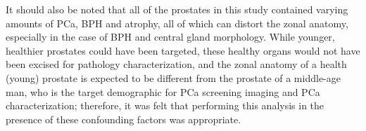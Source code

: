 It should also be noted that all of the prostates in this study contained
varying amounts of PCa, BPH and atrophy, all of which can distort the zonal
anatomy, especially in the case of BPH and central gland morphology.  While
younger, healthier prostates could have been targeted, these healthy organs
would not have been excised for pathology characterization, and the zonal
anatomy of a health (young) prostate is expected to be different from the
prostate of a middle-age man, who is the target demographic for PCa screening
imaging and PCa characterization; therefore, it was felt that performing this
analysis in the presence of these confounding factors was appropriate.
